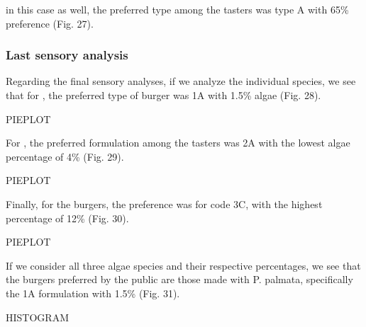 in this case as well, the preferred type among the tasters was type A with 65\% preference (Fig. 27).

\subsubsection{Last sensory analysis}
Regarding the final sensory analyses, if we analyze the individual species, we see that for , the preferred type of burger was 1A with 1.5\% algae (Fig. 28).

PIEPLOT

For , the preferred formulation among the tasters was 2A with the lowest algae percentage of 4\% (Fig. 29).

PIEPLOT

Finally, for the  burgers, the preference was for code 3C, with the highest percentage of 12\% (Fig. 30).

PIEPLOT

If we consider all three algae species and their respective percentages, we see that the burgers preferred by the public are those made with P. palmata, specifically the 1A formulation with 1.5\% (Fig. 31).

HISTOGRAM
